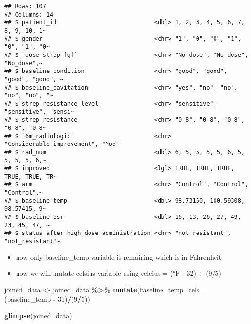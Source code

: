 \documentclass[
]{article}
\newenvironment{Shaded}{\begin{snugshade}}{\end{snugshade}}
\newcommand{\AttributeTok}[1]{\textcolor[rgb]{0.13,0.29,0.53}{#1}}
\newcommand{\DecValTok}[1]{\textcolor[rgb]{0.00,0.00,0.81}{#1}}
\newcommand{\FunctionTok}[1]{\textcolor[rgb]{0.13,0.29,0.53}{\textbf{#1}}}
\newcommand{\NormalTok}[1]{#1}
\newcommand{\OtherTok}[1]{\textcolor[rgb]{0.56,0.35,0.01}{#1}}
\newcommand{\SpecialCharTok}[1]{\textcolor[rgb]{0.81,0.36,0.00}{\textbf{#1}}}
\begin{document}
\begin{verbatim}
## Rows: 107
## Columns: 14
## $ patient_id                            <dbl> 1, 2, 3, 4, 5, 6, 7, 8, 9, 10, 1~
## $ gender                                <chr> "1", "0", "0", "1", "0", "1", "0~
## $ `dose_strep [g]`                      <chr> "No_dose", "No_dose", "No_dose",~
## $ baseline_condition                    <chr> "good", "good", "good", "good", ~
## $ baseline_cavitation                   <chr> "yes", "no", "no", "no", "no", "~
## $ strep_resistance_level                <chr> "sensitive", "sensitive", "sensi~
## $ strep_resistance                      <chr> "0-8", "0-8", "0-8", "0-8", "0-8~
## $ `6m_radiologic`                       <chr> "Considerable_improvement", "Mod~
## $ rad_num                               <dbl> 6, 5, 5, 5, 5, 6, 5, 5, 5, 5, 6,~
## $ improved                              <lgl> TRUE, TRUE, TRUE, TRUE, TRUE, TR~
## $ arm                                   <chr> "Control", "Control", "Control",~
## $ baseline_temp                         <dbl> 98.73150, 100.59308, 98.57415, 9~
## $ baseline_esr                          <dbl> 16, 13, 26, 27, 49, 23, 45, 47, ~
## $ status_after_high_dose_administration <chr> "not_resistant", "not_resistant"~
\end{verbatim}

\begin{itemize}
\item
  now only baseline\_temp variable is remaining which is in Fahrenheit
\item
  now we will mutate celsius variable using celcius = (°F - 32) ÷ (9/5)
\end{itemize}

\begin{Shaded}
\begin{Highlighting}[]
\NormalTok{joined\_data }\OtherTok{\textless{}{-}}\NormalTok{ joined\_data }\SpecialCharTok{\%\textgreater{}\%} 
  \FunctionTok{mutate}\NormalTok{(}\AttributeTok{baseline\_temp\_cels =}\NormalTok{ (baseline\_temp }\SpecialCharTok{{-}} \DecValTok{31}\NormalTok{)}\SpecialCharTok{/}\NormalTok{(}\DecValTok{9}\SpecialCharTok{/}\DecValTok{5}\NormalTok{))}


\FunctionTok{glimpse}\NormalTok{(joined\_data)}
\end{Highlighting}
\end{Shaded}
\end{document}
